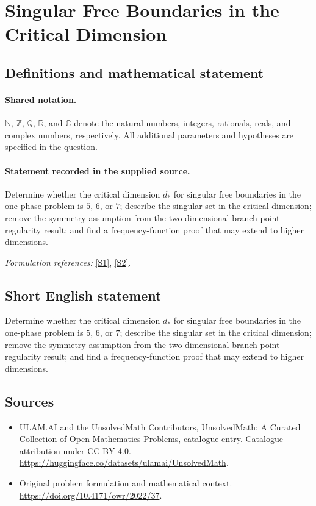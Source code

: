 \documentclass[11pt]{article}
\newcommand{\sref}[2]{\hyperlink{source:#1:#2}{[S#2]}}
\begin{document}
\section{Singular Free Boundaries in the Critical Dimension}\label{statement}

\subsection{Definitions and mathematical statement}

\paragraph{Shared notation.}$\mathbb N$, $\mathbb Z$, $\mathbb Q$, $\mathbb R$, and $\mathbb C$ denote the natural numbers, integers, rationals, reals, and complex numbers, respectively. All additional parameters and hypotheses are specified in the question.


\paragraph{Statement recorded in the supplied source.}
Determine whether the critical dimension $d_*$ for singular free boundaries in the one-phase problem is $5$, $6$, or $7$; describe the singular set in the critical dimension; remove the symmetry assumption from the two-dimensional branch-point regularity result; and find a frequency-function proof that may extend to higher dimensions.
\par\smallskip\textit{Formulation references:} \sref{statement}{1}, \sref{statement}{2}.
\subsection{Short English statement}
Determine whether the critical dimension $d_*$ for singular free boundaries in the one-phase problem is $5$, $6$, or $7$; describe the singular set in the critical dimension; remove the symmetry assumption from the two-dimensional branch-point regularity result; and find a frequency-function proof that may extend to higher dimensions.
\subsection{Sources}
\begin{itemize}
\item[\hypertarget{source:statement:1}{S1}] ULAM.AI and the UnsolvedMath Contributors, UnsolvedMath: A Curated Collection of Open Mathematics Problems, catalogue entry. Catalogue attribution under CC BY 4.0.
\url{https://huggingface.co/datasets/ulamai/UnsolvedMath}.
\item[\hypertarget{source:statement:2}{S2}] Original problem formulation and mathematical context.
\url{https://doi.org/10.4171/owr/2022/37}.
\end{itemize}
\label{end:statement}
\end{document}
